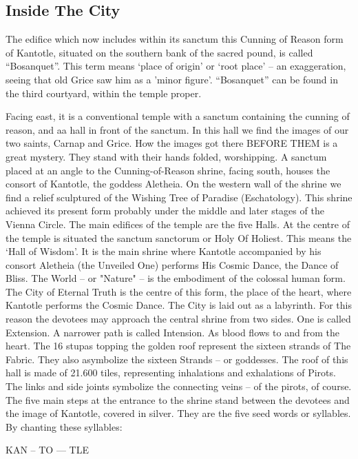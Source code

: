 \documentclass[10pt,titlepage]{book}
\begin{document}
\subsection{Inside The City}

The edifice which now includes within its sanctum this Cunning of Reason
form of Kantotle, situated on the southern bank of the sacred pound, is
called ``Bosanquet''.
This term means ‘place of origin’ or ‘root place’
-- an exaggeration, seeing that old Grice saw him as a 'minor
figure'. ``Bosanquet'' can be found in the third courtyard, within the
temple proper.

Facing east, it is a conventional temple with a sanctum containing the
cunning of reason, and aa hall in front of the sanctum. In this hall we
find the images of our two saints, Carnap and Grice. How the images got
there BEFORE THEM is a great mystery. They stand with their hands
folded, worshipping.
A sanctum placed at an angle to the
Cunning-of-Reason shrine, facing south, houses the consort of Kantotle,
the goddess Aletheia. On the western wall of the shrine we find a
relief sculptured of the Wishing Tree of Paradise (Eschatology). This
shrine achieved its present form probably under the middle and later
stages of the Vienna Circle. The main edifices of the temple are the
five Halls. At the centre of the temple is situated the sanctum
sanctorum or Holy Of Holiest. This means the ‘Hall of Wisdom’. It is
the main shrine where Kantotle accompanied by his consort Aletheia (the
Unveiled One) performs His Cosmic Dance, the Dance of Bliss. The World
-- or "Nature" -- is the embodiment of the colossal human form. The
City of Eternal Truth is the centre of this form, the place of the
heart, where Kantotle performs the Cosmic Dance. The City is laid out
as a labyrinth. For this reason the devotees may approach the
central shrine from two sides. One is called Extension. A narrower path
is called Intension. As blood flows to and from the heart. The 16
stupas topping the golden roof represent the sixteen strands of The
Fabric. They also asymbolize the sixteen Strands -- or goddesses. The
roof of this hall is made of 21.600 tiles, representing
inhalations and exhalations of Pirots.
The links and side joints symbolize the connecting veins -- of the
pirots, of course. The five main steps at the entrance to the shrine
stand between the devotees and the image of Kantotle, covered in
silver. They are the five seed words or syllables. By chanting these
syllables:

\begin{center}
KAN -- TO --- TLE
\end{center}
\end{document}
